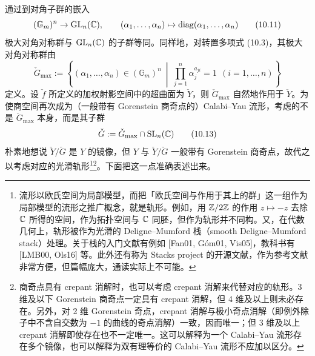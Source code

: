通过到对角子群的嵌入
\begin{equation}
    (\mathbb{G}_m)^{n}\to\mathrm{GL}_n(\mathbb{C}),\qquad (\alpha_1,\ldots,\alpha_n)\mapsto\operatorname{diag}(\alpha_1,\ldots,\alpha_n) \tag{10.11}
\end{equation}
极大对角对称群与 $\mathrm{GL}_n(\mathbb{C})$ 的子群等同。同样地，对转置多项式 (10.3)，其极大对角对称群由
\begin{equation}
    \check G_{\max}:=\left\{(\alpha_1,\ldots,\alpha_n)\in(\mathbb{G}_m)^{n}\ \middle|\ \prod_{j=1}^{n}\alpha_j^{a_{ji}}=1\ \ (i=1,\ldots,n)\right\} \tag{10.12}
\end{equation}
定义。设 $\check f$ 所定义的加权射影空间中的超曲面为 $\check Y$，则 $\check G_{\max}$ 自然地作用于 $\check Y$。为使商空间再次成为（一般带有 Gorenstein 商奇点的）Calabi–Yau 流形，考虑的不是 $\check G_{\max}$ 本身，而是其子群
\begin{equation}
    \check G:=\check G_{\max}\cap\mathrm{SL}_n(\mathbb{C}) \tag{10.13}
\end{equation}
朴素地想说 $\check Y/\check G$ 是 $Y$ 的镜像，但 $Y$ 与 $\check Y/\check G$ 一般带有 Gorenstein 商奇点，故代之以考虑对应的光滑轨形\footnote{流形以欧氏空间为局部模型，而把「欧氏空间与作用于其上的群」这一组作为局部模型的流形之推广概念，就是轨形。例如，用 $\mathbb{Z}/2\mathbb{Z}$ 的作用 $z\mapsto -z$ 去除 $\mathbb{C}$ 所得的空间，作为拓扑空间与 $\mathbb{C}$ 同胚，但作为轨形并不同构。又，在代数几何上，轨形被作为光滑的 Deligne–Mumford 栈（smooth Deligne–Mumford stack）处理。关于栈的入门文献有例如 [Fan01, Góm01, Vis05]，教科书有 [LMB00, Ols16] 等。此外还有称为 Stacks project 的开源文献，作为参考文献非常方便，但篇幅庞大，通读实际上不可能。}\footnote{商奇点具有 crepant 消解时，也可以考虑 crepant 消解来代替对应的轨形。3 维及以下 Gorenstein 商奇点一定具有 crepant 消解，但 4 维及以上则未必存在。另外，对 2 维 Gorenstein 奇点，crepant 消解与极小奇点消解（即例外除子中不含自交数为 $-1$ 的曲线的奇点消解）一致，因而唯一；但 3 维及以上 crepant 消解即使存在也不一定唯一。这可以解释为一个 Calabi–Yau 流形存在多个镜像，也可以解释为双有理等价的 Calabi–Yau 流形不应加以区分。}。下面把这一点准确表述出来。

